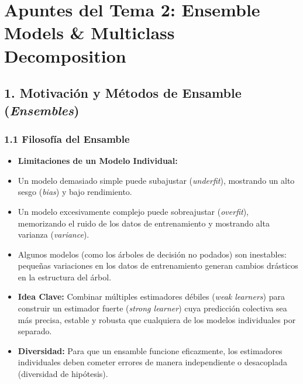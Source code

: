 \documentclass[11pt,oneside]{article}
\begin{document}
\tableofcontents
\clearpage
{}
\section{Apuntes del Tema 2: Ensemble Models \& Multiclass Decomposition}

\subsection{1. Motivación y Métodos de Ensamble (\emph{Ensembles})}

\subsubsection{1.1 Filosofía del Ensamble}

\begin{itemize}

\item \textbf{Limitaciones de un Modelo Individual:}

\item Un modelo demasiado simple puede subajustar (\emph{underfit}), mostrando un alto sesgo (\emph{bias}) y bajo rendimiento.

\item Un modelo excesivamente complejo puede sobreajustar (\emph{overfit}), memorizando el ruido de los datos de entrenamiento y mostrando alta varianza (\emph{variance}).

\item Algunos modelos (como los árboles de decisión no podados) son inestables: pequeñas variaciones en los datos de entrenamiento generan cambios drásticos en la estructura del árbol.

\item \textbf{Idea Clave:} Combinar múltiples estimadores débiles (\emph{weak learners}) para construir un estimador fuerte (\emph{strong learner}) cuya predicción colectiva sea más precisa, estable y robusta que cualquiera de los modelos individuales por separado.

\item \textbf{Diversidad:} Para que un ensamble funcione eficazmente, los estimadores individuales deben cometer errores de manera independiente o desacoplada (diversidad de hipótesis).

\end{itemize}
\end{document}

